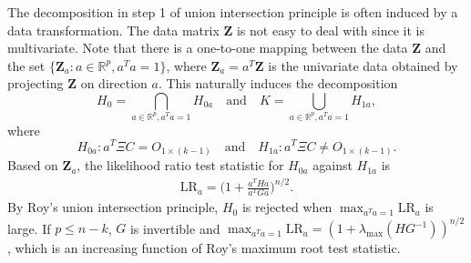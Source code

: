 \documentclass[12pt]{article} %
\newcommand{\bZ}{\mathbf{Z}}
\newcommand{\bX}{\mathbf{X}}
\theoremstyle{definition}
\begin{document}
The decomposition in step 1 of union intersection principle is often induced by a data transformation.
The data matrix $\bZ$ is not easy to deal with since it is multivariate. 
 Note that there is a one-to-one mapping between the data $\bZ$ and the set $\{\bZ_a: a\in\mathbb{R}^p, a^T a=1\}$, where $\bZ_a=a^T \bZ$ is the univariate data obtained by projecting $\bZ$ on direction $a$.
 This naturally induces the decomposition  
 $$H_0=\bigcap_{a\in \mathbb{R}^p, a^T a=1}H_{0a} \quad\text{and}\quad K=\bigcup_{a\in \mathbb{R}^p,a^T a=1}H_{1a} ,$$
 where
 $$
 H_{0a}: a^T \Xi C = O_{1\times (k-1)}\quad \text{and}\quad H_{1a} : a^T \Xi C \neq O_{1\times (k-1)}.
 $$
Based on $\bZ_a$, the likelihood ratio test statistic for $H_{0a}$ against $H_{1a}$ is
\begin{equation*}
    \begin{aligned}
        \text{LR}_{a}%
        =
        \Big(1+\frac{a^T Ha}{a^T G a}\Big)^{n/2}.
    \end{aligned}
\end{equation*}
By Roy's union intersection principle, $H_0$ is rejected when $\max_{a^T a=1}\text{LR}_a$ is large.
If $p\leq n-k$, $G$ is invertible and
$\max_{a^T a=1}\text{LR}_a=(1+\lambda_{\max}(HG^{-1}))^{n/2}$, which is an increasing function of Roy's maximum root test statistic.
\end{document}
